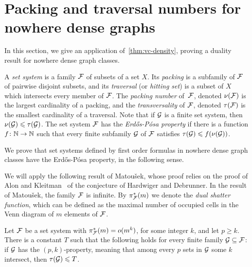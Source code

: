 \section{Packing and traversal numbers for nowhere dense graphs}
In this section, we give an application 
of~\cref{thm:vc-density}, proving a 
duality result for nowhere dense graph classes.

A \emph{set system} is a family  $\cal F$ of subsets of a set $X$.
Its  \emph{packing} is a subfamily of $\cal F$ of pairwise disjoint subsets, and its \emph{traversal} (or \emph{hitting set}) is a subset of $X$ which intersects every member of $\cal F$.
The \emph{packing number} of~$\cal F$, denoted $\nu(\cal F)$ is the largest cardinality of a packing,
and the \emph{transversality} of $\cal F$, denoted
$\tau(\cal F)$ is the smallest cardinality of a traversal.
Note that if $\cal G$ is a finite set system, then
$\nu({\cal G})\le \tau(\cal G)$. 
The set system $\cal F$ has the \emph{Erd{\H o}s-P\'{o}sa property} if there is a function $f\from\N\to\N$ such that every finite subfamily $\cal G$ of $\cal F$
satisfies $\tau({\cal G})\le f(\nu(\cal G))$. 

We prove that set systems defined by first order formulas in nowhere dense graph classes have the Erd{\H o}s-P\'{o}sa property, in the following sense.

\erdosposa*



We will apply the following result of Matou{\v s}ek,
 whose proof relies on the  proof of Alon and Kleitman~\cite{ALON1992103} of the conjecture of Hardwiger and Debrunner. 
In the result of Matou{\v s}ek, the family $\cal F$ is infinite. By $\pi_{\cal F}^*(m)$ we denote the \emph{dual shatter function}, which can be defined as the maximal number 
of occupied cells in the Venn diagram of $m$ elements of $\cal F$.


\begin{theorem}\label{thm:pq}
	Let $\cal F$ be a set system with $\pi^*_{\cal F}(m)=o(m^k)$,
	for some integer $k$, and let $p\ge k$.
	There is a constant $T$ such that the following holds for every finite family $\cal G\subset \cal F$: 
	if $\cal G$ has the $(p,k)$-property, meaning that 
	among every $p$ sets in $\cal G$ some $k$ intersect, then $\tau ({\cal G})\le T$.
\end{theorem}

